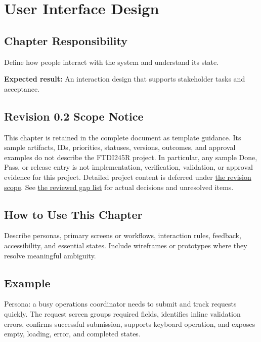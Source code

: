 \chapter{User Interface Design}
\section{Chapter Responsibility}
\label{Section:UserInterfaceDesignResponsibility}
Define how people interact with the system and understand its state.

\noindent\textbf{Expected result:} An interaction design that supports stakeholder tasks and acceptance.

\section{Revision 0.2 Scope Notice}
\label{Section:DeferredUserInterfaceDesign}
\begin{fsaNote}
This chapter is retained in the complete document as template guidance.
Its sample artifacts, IDs, priorities, statuses, versions, outcomes, and
approval examples do not describe the FTDI245R project. In particular, any
sample Done, Pass, or release entry is not implementation, verification,
validation, or approval evidence for this project. Detailed project content
is deferred under \hyperref[Section:ProjectScope]{the revision scope}.
See \hyperref[Table:ProjectGapReview]{the reviewed gap list} for actual
decisions and unresolved items.
\end{fsaNote}

\section{How to Use This Chapter}
Describe personas, primary screens or workflows, interaction rules, feedback, accessibility, and essential states. Include wireframes or prototypes where they resolve meaningful ambiguity.
\section{Example}
Persona: a busy operations coordinator needs to submit and track requests quickly. The request screen groups required fields, identifies inline validation errors, confirms successful submission, supports keyboard operation, and exposes empty, loading, error, and completed states.
